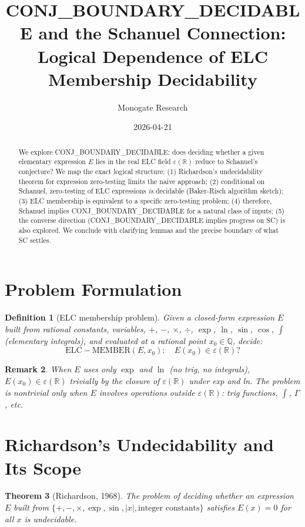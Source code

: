 \documentclass[11pt]{article}
\title{CONJ\_BOUNDARY\_DECIDABLE and the Schanuel Connection:\\
Logical Dependence of ELC Membership Decidability}
\author{Monogate Research}
\date{2026-04-21}
\newtheorem{theorem}{Theorem}
\newtheorem{definition}[theorem]{Definition}
\newtheorem{remark}[theorem]{Remark}
\begin{document}
\maketitle

\begin{abstract}
We explore CONJ\_BOUNDARY\_DECIDABLE: does deciding whether a given elementary expression
$E$ lies in the real ELC field $\varepsilon(\mathbb{R})$ reduce to Schanuel's conjecture?
We map the exact logical structure: (1) Richardson's undecidability theorem for
expression zero-testing limits the naive approach; (2) conditional on Schanuel,
zero-testing of ELC expressions \emph{is} decidable (Baker-Risch algorithm sketch);
(3) ELC membership is equivalent to a specific zero-testing problem;
(4) therefore, Schanuel implies CONJ\_BOUNDARY\_DECIDABLE for a natural class of inputs;
(5) the converse direction (CONJ\_BOUNDARY\_DECIDABLE implies progress on SC) is also explored.
We conclude with clarifying lemmas and the precise boundary of what SC settles.
\end{abstract}

\section{Problem Formulation}

\begin{definition}[ELC membership problem]
Given a closed-form expression $E$ built from rational constants, variables, $+$, $-$,
$\times$, $\div$, $\exp$, $\ln$, $\sin$, $\cos$, $\int$ (elementary integrals),
and evaluated at a rational point $x_0\in\mathbb{Q}$, decide:
\[
\mathrm{ELC-MEMBER}(E,x_0): \quad E(x_0)\in\varepsilon(\mathbb{R})?
\]
\end{definition}

\begin{remark}
When $E$ uses only $\exp$ and $\ln$ (no trig, no integrals), $E(x_0)\in\varepsilon(\mathbb{R})$
trivially by the closure of $\varepsilon(\mathbb{R})$ under exp and ln. The problem is nontrivial
only when $E$ involves operations outside $\varepsilon(\mathbb{R})$: trig functions, $\int$,
$\Gamma$, etc.
\end{remark}

\section{Richardson's Undecidability and Its Scope}

\begin{theorem}[Richardson, 1968]
\label{thm:richardson}
The problem of deciding whether an expression $E$ built from
$\{+, -, \times, \exp, \sin, |x|, \text{integer constants}\}$
satisfies $E(x)=0$ for all $x$ is undecidable.
\end{theorem}
\end{document}
